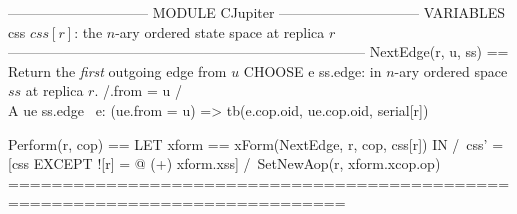 \documentclass{article}
\begin{document}
\begin{tla}
------------------------------ MODULE CJupiter ------------------------------
VARIABLES css  \* $css[r]$: the $n$-ary ordered state space at replica $r$
-----------------------------------------------------------------------------
NextEdge(r, u, ss) ==     \* Return the \emph{first} outgoing edge from $u$ 
    CHOOSE e \in ss.edge: \* in $n$-ary ordered space $ss$ at replica $r$.
        /\e.from = u 
        /\\A ue \in ss.edge \ {e}: 
           (ue.from = u) => tb(e.cop.oid, ue.cop.oid, serial[r])
    
Perform(r, cop) == 
    LET xform == xForm(NextEdge, r, cop, css[r])
    IN  /\ css' = [css EXCEPT ![r] = @ (+) xform.xss]
        /\ SetNewAop(r, xform.xcop.op)
=============================================================================
\end{tla}
\end{document}

